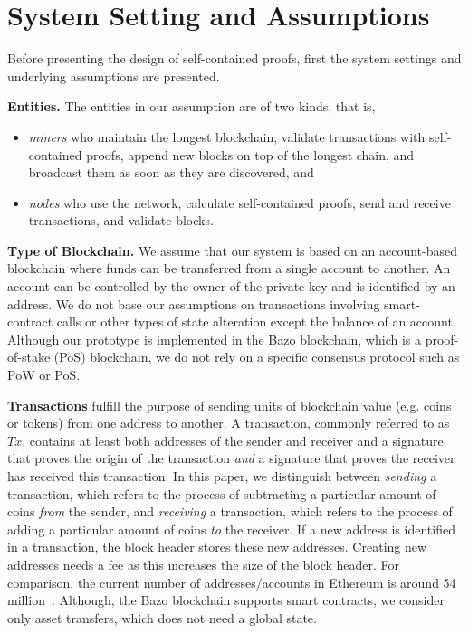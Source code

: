 \documentclass[conference]{IEEEtran}
\begin{document}
\section{System Setting and Assumptions}
Before presenting the design of self-contained proofs, first the system settings and underlying assumptions are presented.

\textbf{Entities.} The entities in our assumption are of two kinds, that is,
\begin{itemize}
	\item \textit{miners} who maintain the longest blockchain, validate transactions with self-contained proofs, append new blocks on top of the longest chain, and broadcast them as soon as they are discovered, and
	\item \textit{nodes} who use the network, calculate self-contained proofs, send and receive transactions, and validate blocks.
\end{itemize}

\textbf{Type of Blockchain.} We assume that our system is based on an account-based blockchain where funds can be transferred from a single account to another. An account can be controlled by the owner of the private key and is identified by an address. We do not base our assumptions on transactions involving smart-contract calls or other types of state alteration except the balance of an account. Although our prototype is implemented in the Bazo blockchain, which is a proof-of-stake (PoS) blockchain, we do not rely on a specific consensus protocol such as PoW or PoS.

\textbf{Transactions} fulfill the purpose of sending units of blockchain value (e.g. coins or tokens) from one address to another. A transaction, commonly referred to as $Tx$, contains at least both addresses of the sender and receiver and a signature that proves the origin of the transaction \textit{and} a signature that proves the receiver has received this transaction. In this paper, we distinguish between \textit{sending} a transaction, which refers to the process of subtracting a particular amount of coins \textit{from} the sender, and \textit{receiving} a transaction, which refers to the process of adding a particular amount of coins \textit{to} the receiver. If a new address is identified in a transaction, the block header stores these new addresses. Creating new addresses needs a fee as this increases the size of the block header. For comparison, the current number of addresses/accounts in Ethereum is around 54 million~\cite{Acc}. Although, the Bazo blockchain supports smart contracts, we consider only asset transfers, which does not need a global state.
\end{document}
